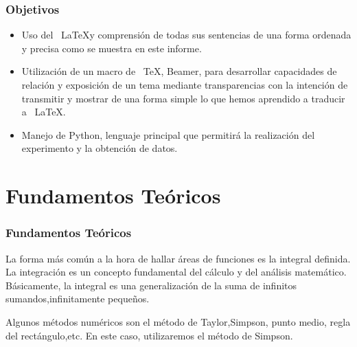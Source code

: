 \documentclass{beamer}
\begin{document}
\begin{frame}

\frametitle{Objetivos}
\begin{block}{}
  \begin{itemize}
  \item Uso del ~\LaTeX y comprensión de todas sus sentencias de una forma ordenada y precisa como se muestra en este informe.
  \item Utilización de un macro de ~\TeX, Beamer, para desarrollar capacidades de relación y exposición de un tema mediante transparencias 
con la intención de transmitir y mostrar de una forma simple lo que hemos aprendido a traducir a ~\LaTeX.
  \item Manejo de Python, lenguaje principal que permitirá la realización del experimento y la obtención de datos.
  \end{itemize}
\end{block}

\end{frame}

\section{Fundamentos Teóricos}


\begin{frame}
\frametitle{Fundamentos Teóricos}
\begin{block}{}
La forma más común a la hora de hallar áreas de funciones es la integral definida.
La integración es un concepto fundamental del cálculo y del análisis matemático. Básicamente, la integral es una generalización 
de la suma de infinitos sumandos,infinitamente pequeños.
\end{block}
\begin{block}{}
 Algunos métodos numéricos son el método de Taylor,Simpson, punto medio, regla del rectángulo,etc. En este caso, utilizaremos el método de Simpson.
\end{block}
\end{frame}
\end{document}
